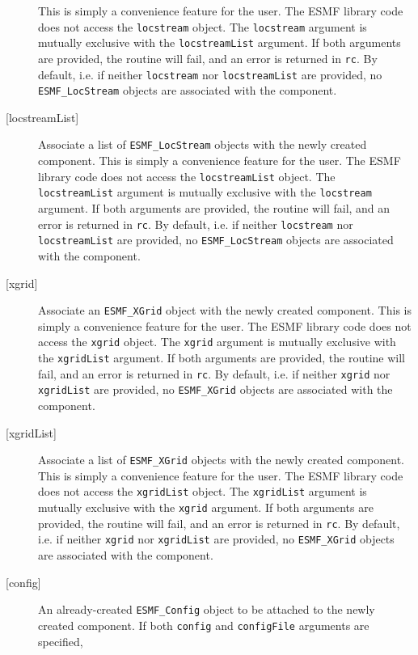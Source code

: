 \begin{description}
     This is simply a convenience feature for the user. The ESMF library code
     does not access the {\tt locstream} object.
     The {\tt locstream} argument is mutually exclusive with the
     {\tt locstreamList}
     argument. If both arguments are provided, the routine will fail, and an
     error is returned in {\tt rc}.
     By default, i.e. if neither {\tt locstream} nor {\tt locstreamList} are
     provided, no {\tt ESMF\_LocStream} objects are associated with the
     component.
   \item[{[locstreamList]}]
     Associate a list of {\tt ESMF\_LocStream} objects with the newly created
     component.
     This is simply a convenience feature for the user. The ESMF library code
     does not access the {\tt locstreamList} object.
     The {\tt locstreamList} argument is mutually exclusive with the
     {\tt locstream}
     argument. If both arguments are provided, the routine will fail, and an
     error is returned in {\tt rc}.
     By default, i.e. if neither {\tt locstream} nor {\tt locstreamList} are
     provided, no {\tt ESMF\_LocStream} objects are associated with the
     component.
   \item[{[xgrid]}]
     Associate an {\tt ESMF\_XGrid} object with the newly created component.
     This is simply a convenience feature for the user. The ESMF library code
     does not access the {\tt xgrid} object.
     The {\tt xgrid} argument is mutually exclusive with the {\tt xgridList}
     argument. If both arguments are provided, the routine will fail, and an
     error is returned in {\tt rc}.
     By default, i.e. if neither {\tt xgrid} nor {\tt xgridList} are provided,
     no {\tt ESMF\_XGrid} objects are associated with the component.
   \item[{[xgridList]}]
     Associate a list of {\tt ESMF\_XGrid} objects with the newly created
     component.
     This is simply a convenience feature for the user. The ESMF library code
     does not access the {\tt xgridList} object.
     The {\tt xgridList} argument is mutually exclusive with the {\tt xgrid}
     argument. If both arguments are provided, the routine will fail, and an
     error is returned in {\tt rc}.
     By default, i.e. if neither {\tt xgrid} nor {\tt xgridList} are provided,
     no {\tt ESMF\_XGrid} objects are associated with the component.
   \item[{[config]}]
     An already-created {\tt ESMF\_Config} object to be attached to the newly
     created component.
     If both {\tt config} and {\tt configFile} arguments are specified,

\end{description}
